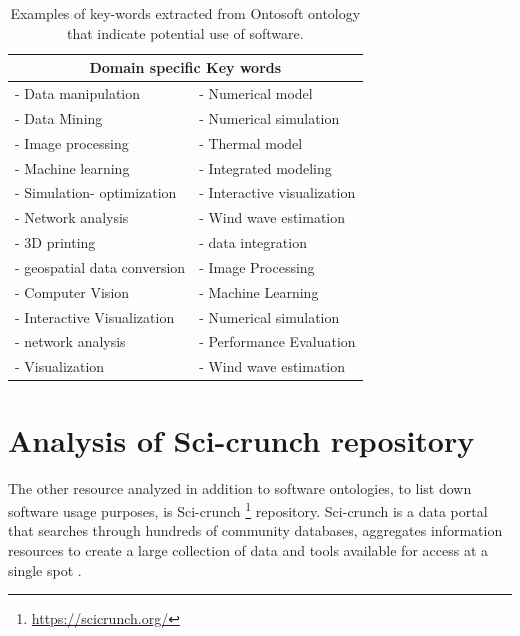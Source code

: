 \begin{table}[h!]
	\begin{center}
		\caption{Examples of key-words extracted from Ontosoft ontology that indicate potential use of software.}
		\label{tab:table1}
		\begin{tabular}{|l|l|} %
			
			\hline
			\multicolumn{2}{|c|}{Domain specific Key words }\\
			\hline
			-	Data manipulation & -	Numerical model \\
			-	Data Mining       & -	Numerical simulation \\
			-	Image processing  & -   Thermal model \\
			-	Machine learning  & -   Integrated modeling \\
			-	Simulation- optimization & - Interactive visualization \\
			-	Network analysis & - Wind wave estimation \\
			- 3D printing         & - data integration \\
			- geospatial data conversion & - Image Processing \\
			- Computer Vision & - Machine Learning \\
			- Interactive Visualization & - Numerical simulation \\
			- network analysis & - Performance Evaluation \\
			- Visualization & -  Wind wave estimation \\
			\hline
		\end{tabular}
	\end{center}
\end{table}

\section{Analysis of Sci-crunch repository }
\label{sec:purpose:Sci}

The other resource analyzed in addition to software ontologies, to list down software usage purposes, is Sci-crunch \footnote{\url{https://scicrunch.org/}} repository. Sci-crunch is a data portal that searches through hundreds of community databases, aggregates information resources to create a large collection of data and tools available for access at a single spot \citep{grethe2016scicrunch}. \\

